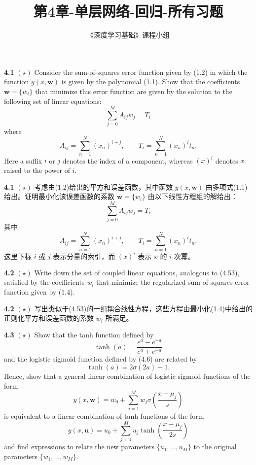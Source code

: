 \documentclass{article}
\title{第4章-单层网络-回归-所有习题}
\author{《深度学习基础》课程小组}
\begin{document}
\maketitle

\textbf{4.1} $(\star)$ Consider the sum-of-squares error function given by (1.2) in which the function $y(x, \mathbf{w})$ is given by the polynomial (1.1). Show that the coefficients $\mathbf{w} = \{w_i\}$ that minimize this error function are given by the solution to the following set of linear equations:
\begin{equation}
\sum_{j=0}^{M} A_{ij} w_j = T_i \tag{4.53}
\end{equation}
where
\begin{equation}
A_{ij} = \sum_{n=1}^{N} (x_n)^{i+j}, \qquad T_i = \sum_{n=1}^{N} (x_n)^i t_n. \tag{4.54}
\end{equation}
Here a suffix $i$ or $j$ denotes the index of a component, whereas $(x)^i$ denotes $x$ raised to the power of $i$.

\textbf{4.1} $(\star)$ 考虑由(1.2)给出的平方和误差函数，其中函数 $y(x, \mathbf{w})$ 由多项式(1.1)给出。证明最小化该误差函数的系数 $\mathbf{w} = \{w_i\}$ 由以下线性方程组的解给出：
\begin{equation}
\sum_{j=0}^{M} A_{ij} w_j = T_i \tag{4.53}
\end{equation}
其中
\begin{equation}
A_{ij} = \sum_{n=1}^{N} (x_n)^{i+j}, \qquad T_i = \sum_{n=1}^{N} (x_n)^i t_n. \tag{4.54}
\end{equation}
这里下标 $i$ 或 $j$ 表示分量的索引，而 $(x)^i$ 表示 $x$ 的 $i$ 次幂。


\textbf{4.2} $(\star)$ Write down the set of coupled linear equations, analogous to (4.53), satisfied by the coefficients $w_i$ that minimize the regularized sum-of-squares error function given by (1.4).

\textbf{4.2} $(\star)$ 写出类似于(4.53)的一组耦合线性方程，这些方程由最小化(1.4)中给出的正则化平方和误差函数的系数 $w_i$ 所满足。


\textbf{4.3} $(\star)$ Show that the tanh function defined by
\begin{equation}
\tanh(a) = \frac{e^a - e^{-a}}{e^a + e^{-a}} \tag{4.55}
\end{equation}
and the logistic sigmoid function defined by (4.6) are related by
\begin{equation}
\tanh(a) = 2\sigma(2a) - 1. \tag{4.56}
\end{equation}
Hence, show that a general linear combination of logistic sigmoid functions of the form
\begin{equation}
y(x, \mathbf{w}) = w_0 + \sum_{j=1}^{M} w_j \sigma \left( \frac{x - \mu_j}{s} \right) \tag{4.57}
\end{equation}
is equivalent to a linear combination of tanh functions of the form
\begin{equation}
y(x, \mathbf{u}) = u_0 + \sum_{j=1}^{M} u_j \tanh \left( \frac{x - \mu_j}{2s} \right) \tag{4.58}
\end{equation}
and find expressions to relate the new parameters $\{u_1, \dots, u_M\}$ to the original parameters $\{w_1, \dots, w_M\}$.
\end{document}
